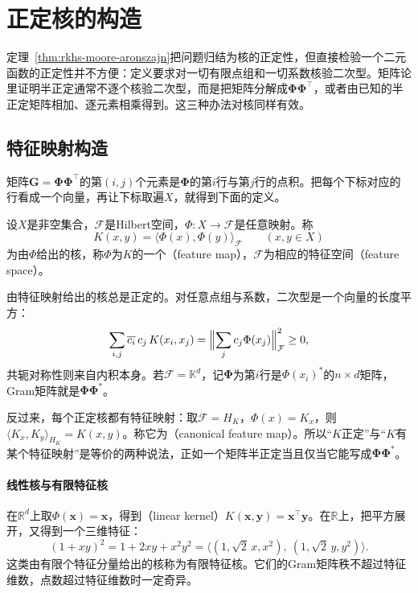 \section{正定核的构造}
\label{sec:rkhs-kernel-constructions}

定理~\ref{thm:rkhs-moore-aronszajn}把问题归结为核的正定性，但直接检验一个二元函数的正定性并不方便：定义要求对一切有限点组和一切系数核验二次型。矩阵论里证明半正定通常不逐个核验二次型，而是把矩阵分解成$\bm\Phi\bm\Phi^{\top}$，或者由已知的半正定矩阵相加、逐元素相乘得到。这三种办法对核同样有效。

\subsection{特征映射构造}
\label{sec:rkhs-feature-maps}

矩阵$\bm G=\bm\Phi\bm\Phi^{\top}$的第$(i,j)$个元素是$\bm\Phi$的第$i$行与第$j$行的点积。把每个下标对应的行看成一个向量，再让下标取遍$X$，就得到下面的定义。

\begin{definition}[特征映射]
\label{def:rkhs-feature-map}
设$X$是非空集合，$\mathcal F$是Hilbert空间，$\Phi:X\to\mathcal F$是任意映射。称
\begin{equation}
K(x,y)=\langle\Phi(x),\Phi(y)\rangle_{\mathcal F}\qquad(x,y\in X)
\label{eq:rkhs-feature-kernel}
\end{equation}
为由$\Phi$给出的核，称$\Phi$为$K$的一个（feature map），$\mathcal F$为相应的特征空间（feature space）。
\end{definition}

由特征映射给出的核总是正定的。对任意点组与系数，二次型是一个向量的长度平方：
\[
\sum_{i,j}\overline{c_i}\,c_j\,K(x_i,x_j)=\Bigl\lVert\sum_jc_j\Phi(x_j)\Bigr\rVert_{\mathcal F}^2\geq0 ,
\]
共轭对称性则来自内积本身。若$\mathcal F=\mathbb K^d$，记$\bm\Phi$为第$i$行是$\Phi(x_i)^*$的$n\times d$矩阵，Gram矩阵就是$\bm\Phi\bm\Phi^*$。

反过来，每个正定核都有特征映射：取$\mathcal F=H_K$，$\Phi(x)=K_x$，则$\langle K_x,K_y\rangle_{H_K}=K(x,y)$。称它为（canonical feature map）。所以“$K$正定”与“$K$有某个特征映射”是等价的两种说法，正如一个矩阵半正定当且仅当它能写成$\bm\Phi\bm\Phi^*$。

\paragraph{线性核与有限特征核}

在$\mathbb R^d$上取$\Phi(\bm x)=\bm x$，得到（linear kernel）$K(\bm x,\bm y)=\bm x^{\top}\bm y$。在$\mathbb R$上，把平方展开，又得到一个三维特征：
\[
(1+xy)^2=1+2xy+x^2y^2=\bigl\langle(1,\sqrt2\,x,x^2),\ (1,\sqrt2\,y,y^2)\bigr\rangle .
\]
这类由有限个特征分量给出的核称为有限特征核。它们的Gram矩阵秩不超过特征维数，点数超过特征维数时一定奇异。

